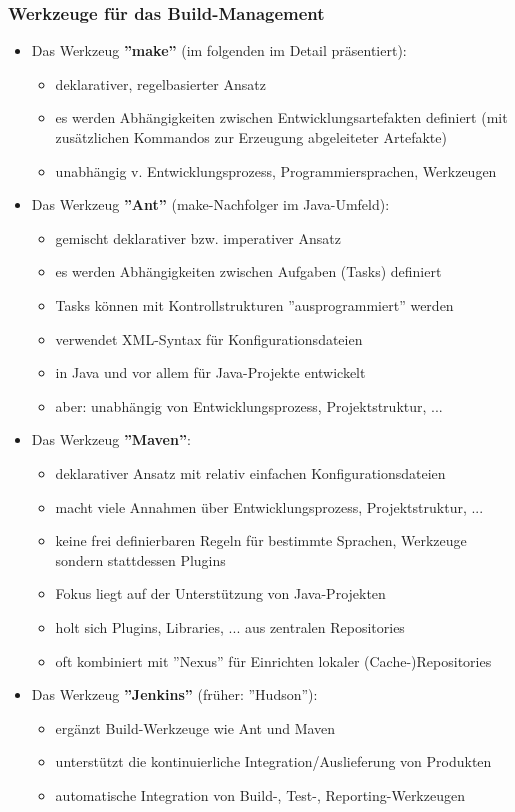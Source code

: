 \subsubsection{Werkzeuge für das Build-Management}
\begin{itemize}
	\item Das Werkzeug \textbf{''make''} (im folgenden im Detail präsentiert): 
	\begin{itemize}
		\item deklarativer, regelbasierter Ansatz
		\item es werden Abhängigkeiten zwischen Entwicklungsartefakten definiert (mit zusätzlichen Kommandos zur Erzeugung abgeleiteter Artefakte)
		\item unabhängig v. Entwicklungsprozess, Programmiersprachen, Werkzeugen
	\end{itemize}
	\item Das Werkzeug \textbf{''Ant''} (make-Nachfolger im Java-Umfeld):
	\begin{itemize}
		\item gemischt deklarativer bzw. imperativer Ansatz
		\item es werden Abhängigkeiten zwischen Aufgaben (Tasks) definiert
		\item Tasks können mit Kontrollstrukturen ''ausprogrammiert'' werden
		\item verwendet XML-Syntax für Konfigurationsdateien
		\item in Java und vor allem für Java-Projekte entwickelt
		\item aber: unabhängig von Entwicklungsprozess, Projektstruktur, ...
	\end{itemize}
	\item Das Werkzeug \textbf{''Maven''}: 
	\begin{itemize}
		\item deklarativer Ansatz mit relativ einfachen Konfigurationsdateien
		\item macht viele Annahmen über Entwicklungsprozess, Projektstruktur, ...
		\item  keine frei definierbaren Regeln für bestimmte Sprachen, Werkzeuge sondern stattdessen Plugins
		\item Fokus liegt auf der Unterstützung von Java-Projekten
		\item holt sich Plugins, Libraries, ... aus zentralen Repositories
		\item oft kombiniert mit ''Nexus'' für Einrichten lokaler (Cache-)Repositories
	\end{itemize}
	\item Das Werkzeug \textbf{''Jenkins''} (früher: ''Hudson''):
	\begin{itemize}
		\item ergänzt Build-Werkzeuge wie Ant und Maven
		\item unterstützt die kontinuierliche Integration/Auslieferung von Produkten
		\item automatische Integration von Build-, Test-, Reporting-Werkzeugen
	\end{itemize}
\end{itemize}
